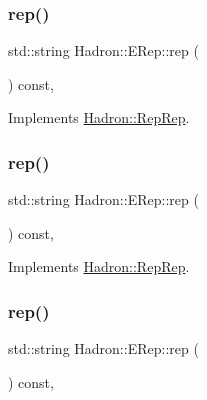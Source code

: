\subsubsection{\texorpdfstring{rep()}{rep()}\hspace{0.1cm}{\footnotesize\ttfamily [1/5]}}
{\footnotesize\ttfamily std\+::string Hadron\+::\+E\+Rep\+::rep (\begin{DoxyParamCaption}{ }\end{DoxyParamCaption}) const\hspace{0.3cm}{\ttfamily [inline]}, {\ttfamily [virtual]}}



Implements \mbox{\hyperlink{structHadron_1_1RepRep_ab3213025f6de249f7095892109575fde}{Hadron\+::\+Rep\+Rep}}.

\mbox{\label{structHadron_1_1ERep_a388db41e3463a65498dca9ba2e1b7960}} 
\subsubsection{\texorpdfstring{rep()}{rep()}\hspace{0.1cm}{\footnotesize\ttfamily [2/5]}}
{\footnotesize\ttfamily std\+::string Hadron\+::\+E\+Rep\+::rep (\begin{DoxyParamCaption}{ }\end{DoxyParamCaption}) const\hspace{0.3cm}{\ttfamily [inline]}, {\ttfamily [virtual]}}



Implements \mbox{\hyperlink{structHadron_1_1RepRep_ab3213025f6de249f7095892109575fde}{Hadron\+::\+Rep\+Rep}}.

\mbox{\label{structHadron_1_1ERep_a388db41e3463a65498dca9ba2e1b7960}} 
\subsubsection{\texorpdfstring{rep()}{rep()}\hspace{0.1cm}{\footnotesize\ttfamily [3/5]}}
{\footnotesize\ttfamily std\+::string Hadron\+::\+E\+Rep\+::rep (\begin{DoxyParamCaption}{ }\end{DoxyParamCaption}) const\hspace{0.3cm}{\ttfamily [inline]}, {\ttfamily [virtual]}}



